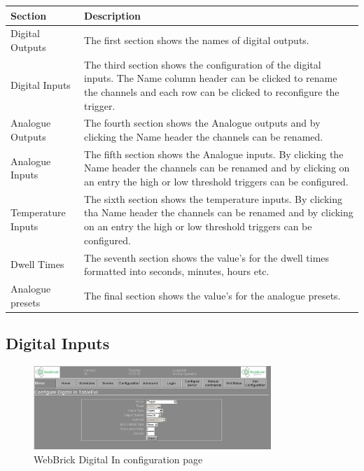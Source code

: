 \begin{tabular}{l|p{12cm}}
Section&Description\\
\hline
Digital Outputs&The first section shows the names of digital outputs. \\

Digital Inputs&The third section shows the configuration of the digital inputs. The Name column header can be
clicked to rename the channels and each row can be clicked to reconfigure the trigger.\\

Analogue Outputs&
The fourth section shows the Analogue outputs and by clicking the Name header the channels can be renamed.\\

Analogue Inputs&
The fifth section shows the Analogue inputs. By clicking the Name header the channels can be renamed and 
by clicking on an entry the high or low threshold triggers can be configured.\\

Temperature Inputs&
The sixth section shows the temperature inputs. By clicking tha Name header the channels can be renamed and 
by clicking on an entry the high or low threshold triggers can be configured.\\

Dwell Times&
The seventh section shows the value's for the dwell times formatted into seconds, minutes, hours etc.\\

Analogue presets&
The final section shows the value's for the analogue presets.\\
\end{tabular}

\subsection{Digital Inputs}

\begin{figure}[H]
\centering
\includegraphics[width=0.8\textwidth]{Images/digitalin.png}
\caption{WebBrick Digital In configuration page}
\end{figure}

